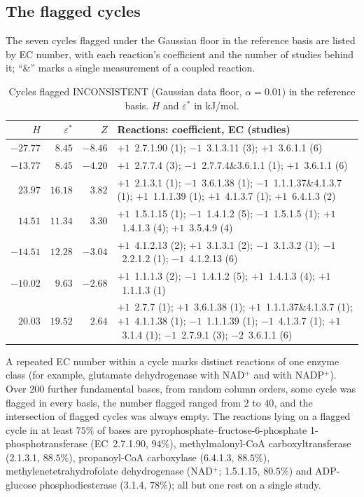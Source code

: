 \documentclass[11pt,a4paper]{article}
\theoremstyle{definition}
\theoremstyle{remark}
\newcommand{\eps}{\varepsilon}
\newcommand{\epsstar}{\eps^{\ast}}
\newcommand{\hol}{H}
\begin{document}
\subsection*{The flagged cycles}

The seven cycles flagged under the Gaussian floor in the reference
basis are listed by EC number, with each reaction's coefficient and the
number of studies behind it; ``\&'' marks a single measurement of a
coupled reaction.

\begin{table}[h]
\centering\footnotesize
\caption{Cycles flagged \textsf{INCONSISTENT} (Gaussian data floor,
$\alpha=0.01$) in the reference basis. $\hol$ and $\epsstar$ in kJ/mol.}
\label{tab:s-flagged}
\begin{tabular}{@{}rrrp{}@{}}
\toprule
$\hol$ & $\epsstar$ & $Z$ & Reactions: coefficient, EC (studies)\\
\midrule
$-27.77$ & $8.45$ & $-8.46$ & $+1$~2.7.1.90 (1); $-1$~3.1.3.11 (3);
$+1$~3.6.1.1 (6)\\
$-13.77$ & $8.45$ & $-4.20$ & $+1$~2.7.7.4 (3); $-1$~2.7.7.4\&3.6.1.1 (1);
$+1$~3.6.1.1 (6)\\
$23.97$ & $16.18$ & $3.82$ & $+1$~2.1.3.1 (1); $-1$~3.6.1.38 (1);
$-1$~1.1.1.37\&4.1.3.7 (1); $+1$~1.1.1.39 (1); $+1$~4.1.3.7 (1);
$+1$~6.4.1.3 (2)\\
$14.51$ & $11.34$ & $3.30$ & $+1$~1.5.1.15 (1); $-1$~1.4.1.2 (5);
$-1$~1.5.1.5 (1); $+1$~1.4.1.3 (4); $+1$~3.5.4.9 (4)\\
$-14.51$ & $12.28$ & $-3.04$ & $+1$~4.1.2.13 (2); $+1$~3.1.3.1 (2);
$-1$~3.1.3.2 (1); $-1$~2.2.1.2 (1); $-1$~4.1.2.13 (6)\\
$-10.02$ & $9.63$ & $-2.68$ & $+1$~1.1.1.3 (2); $-1$~1.4.1.2 (5);
$+1$~1.4.1.3 (4); $+1$~1.1.1.3 (1)\\
$20.03$ & $19.52$ & $2.64$ & $+1$~2.7.7 (1); $+1$~3.6.1.38 (1);
$+1$~1.1.1.37\&4.1.3.7 (1); $+1$~4.1.1.38 (1); $-1$~1.1.1.39 (1);
$-1$~4.1.3.7 (1); $+1$~3.1.4 (1); $-1$~2.7.9.1 (3); $-2$~3.6.1.1 (6)\\
\bottomrule
\end{tabular}
\end{table}

A repeated EC number within a cycle marks distinct reactions of one
enzyme class (for example, glutamate dehydrogenase with NAD$^+$ and
with NADP$^+$). Over $200$ further fundamental bases, from random
column orders, some cycle was flagged in every basis, the number
flagged ranged from $2$ to $40$, and the intersection of flagged cycles
was always empty. The reactions lying on a flagged cycle in at least
$75\%$ of bases are pyrophosphate--fructose-6-phosphate
1-phosphotransferase (EC~2.7.1.90, $94\%$), methylmalonyl-CoA
carboxyltransferase (2.1.3.1, $88.5\%$), propanoyl-CoA carboxylase
(6.4.1.3, $88.5\%$), methylenetetrahydrofolate dehydrogenase
(NAD$^+$; 1.5.1.15, $80.5\%$) and ADP-glucose phosphodiesterase
(3.1.4, $78\%$); all but one rest on a single study.
\end{document}
